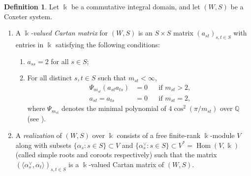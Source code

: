 \documentclass{amsart}
\theoremstyle{plain}
\theoremstyle{definition}
\newtheorem{defn}[thm]{Definition}
\theoremstyle{remark}
\numberwithin{equation}{section}
\newcommand{\defnemph}[1]{\emph{#1}}
\newcommand{\QQ}{\mathbb{Q}}
\DeclareMathOperator{\Hom}{Hom}
\begin{document}
\begin{defn} \label{defn:rlz}
Let $\Bbbk$ be a commutative integral domain, and let $(W,S)$ be a Coxeter system.
\begin{enumerate}
 \item A \defnemph{$\Bbbk$-valued Cartan matrix} for $(W,S)$ is an $S \times S$ matrix $(a_{st})_{s,t \in S}$ with entries in $\Bbbk$ satisfying the following conditions:
 \begin{enumerate}[label=(\roman*)]
 \item $a_{ss}=2$ for all $s \in S$;
 
 \item For all distinct $s,t \in S$ such that $m_{st}<\infty$,
 \begin{equation} \label{eq:minpolycond}
 \begin{aligned}
 \Psi_{m_{st}}(a_{st} a_{ts})& =0 & &\text{if $m_{st}>2$,} \\
 a_{st}=a_{ts}& =0 & & \text{if $m_{st}=2$,}
 \end{aligned}
 \end{equation}
 where $\Psi_{m_{st}}$ denotes the minimal polynomial of $4\cos^2(\pi/m_{st})$ over $\QQ$ (see \cite[(15)]{2colJW}).
 \end{enumerate}
 
 \item A \defnemph{realization} of $(W,S)$ over $\Bbbk$ consists of a free finite-rank $\Bbbk$-module $V$ along with subsets $\{\alpha_s : s \in S\} \subset V$ and $\{\alpha_s^\vee : s \in S\} \subset V^* = \Hom(V,\Bbbk)$ (called simple roots and coroots respectively) such that the matrix $(\langle \alpha_s^\vee, \alpha_t\rangle)_{s,t \in S}$ is a $\Bbbk$-valued Cartan matrix of $(W,S)$.
 
 

\end{enumerate}
\end{defn}
\end{document}
